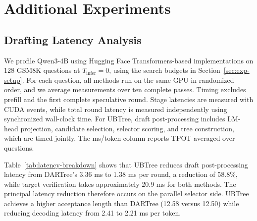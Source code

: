 \section{Additional Experiments}
\label{app:additional-experiments}

\subsection{Drafting Latency Analysis}
\label{sec:exp-latency}

 We profile Qwen3-4B using Hugging Face Transformers-based implementations on 128 GSM8K questions at $T_{\mathrm{infer}}=0$, using the search budgets in Section~\ref{sec:exp-setup}. For each question, all methods run on the same GPU in randomized order, and we average measurements over ten complete passes. Timing excludes prefill and the first complete speculative round. Stage latencies are measured with CUDA events, while total round latency is measured independently using synchronized wall-clock time. For UBTree, draft post-processing includes LM-head projection, candidate selection, selector scoring, and tree construction, which are timed jointly. The ms/token column reports TPOT averaged over questions.

Table~\ref{tab:latency-breakdown} shows that UBTree reduces draft post-processing latency from DARTree's 3.36 ms to 1.38 ms per round, a reduction of 58.8\%, while target verification takes approximately 20.9 ms for both methods. The principal latency reduction therefore occurs on the parallel selector side. UBTree achieves a higher acceptance length than DARTree (12.58 versus 12.50) while reducing decoding latency from 2.41 to 2.21 ms per token.

\begin{table}[htbp]
\centering
\caption{Drafting Latency profiling on Qwen3-4B. Stage and total latencies are in ms per verification round.}
\label{tab:latency-breakdown}
\small
{}
\vspace{2pt}
\end{table}


